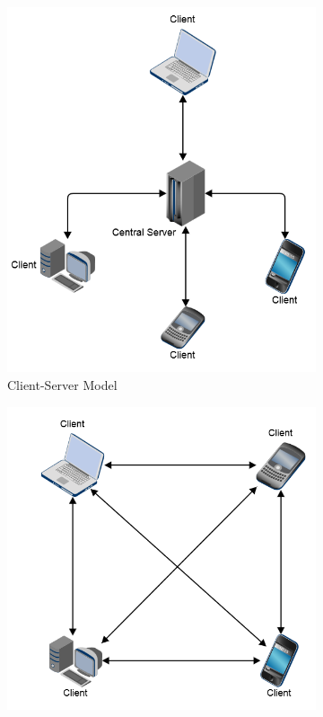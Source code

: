\begin{figure}[!htbp]
	\centering
	\begin{subfigure}[b]{0.35\textwidth}
		\includegraphics[width=\textwidth]{"System Diagram/client_server_simpler"}
		\caption{Client-Server Model}
		\label{subfig:client-server}
	\end{subfigure}
	\begin{subfigure}[b]{0.35\textwidth}
		\includegraphics[width=\textwidth]{"System Diagram/peer_to_peer"}

\end{subfigure}
\end{figure}
